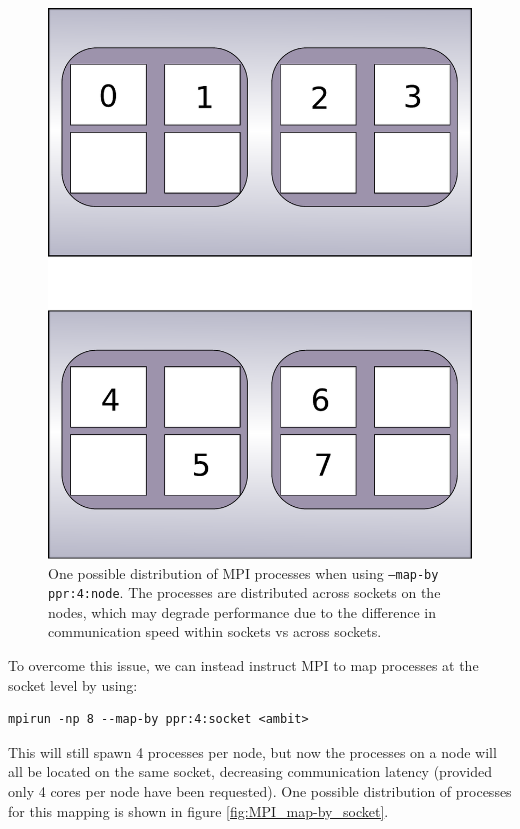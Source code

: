 \documentclass{report}
\begin{document}
\begin{figure}
\label{fig:MPI_map-by_node}
\centering
\includegraphics[height = 0.5\textheight]{MPI_map-by-node.pdf}
\caption{One possible distribution of MPI processes when using \texttt{--map-by ppr:4:node}. The
processes are distributed across sockets on the nodes, which may degrade performance due to the
difference in communication speed within sockets vs across sockets.}
\end{figure}

To overcome this issue, we can instead instruct MPI to map processes at the socket level by using:

\begin{verbatim}
mpirun -np 8 --map-by ppr:4:socket <ambit>
\end{verbatim}

This will still spawn 4 processes per node, but now the processes on a node will all be located on the
same socket, decreasing communication latency (provided only 4
cores per node have been requested). One possible distribution of processes for this mapping is shown in 
figure \ref{fig:MPI_map-by_socket}.
\end{document}
